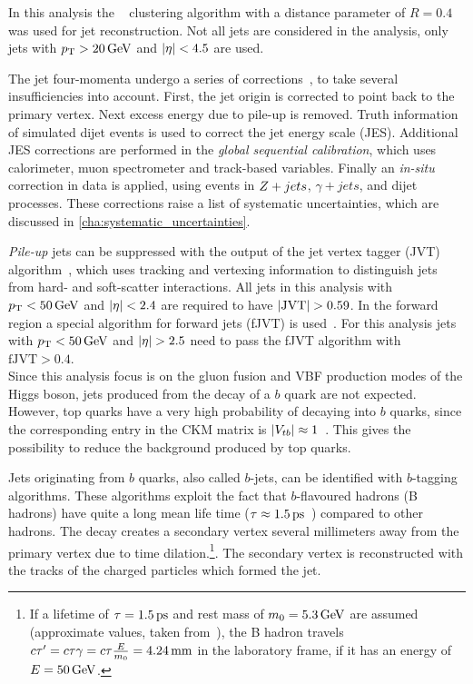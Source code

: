 In this analysis the \antikt{}~\cite{Cacciari:2008gp,Cacciari:2005hq} clustering algorithm with a distance parameter
of $R = 0.4$ was used for jet reconstruction.
Not all jets are considered in the analysis, only jets with $\pt > \unit[20]{GeV}$ and $\left|\eta\right| < 4.5$ are used.

The jet four-momenta undergo a series of corrections~\cite{PERF-2016-04}, to take several insufficiencies into account.
First, the jet origin is corrected to point back to the primary vertex. Next excess energy due to pile-up is removed.
Truth information of simulated dijet events is used to correct the jet energy scale (JES).
Additional JES corrections are performed in the \emph{global sequential calibration}, which uses calorimeter, muon
spectrometer and track-based variables. Finally an \emph{in-situ} correction in data is applied, using events
in $Z+jets$, $\gamma + jets$, and dijet processes.
These corrections raise a list of systematic uncertainties, which are discussed in \cref{cha:systematic_uncertainties}.

\emph{Pile-up} jets can be suppressed with the output of the jet vertex tagger (JVT) algorithm~\cite{PERF-2014-03}, which
uses tracking and vertexing information to distinguish jets from hard- and soft-scatter interactions.
All jets in this analysis with $\pt < \unit[50]{GeV}$ and $\left|\eta\right| < 2.4$ are required to have $\left|\text{JVT}\right| > 0.59$.
In the forward region a special algorithm for forward jets (fJVT) is used~\cite{ATL-PHYS-PUB-2015-034}.
For this analysis jets with $\pt < \unit[50]{GeV}$ and $\left|\eta\right| > 2.5$ need to pass the fJVT algorithm with
$\text{fJVT} > 0.4$.
\\[\baselineskip]
Since this analysis focus is on the gluon fusion and VBF production modes of the Higgs boson, jets produced from
the decay of a $b$ quark are not expected. However, top quarks have a very high probability of decaying into $b$ quarks,
since the corresponding entry in the CKM matrix is $\left|V_{tb}\right| \approx 1$~\cite{PDG}.
This gives the possibility to reduce the background produced by top quarks.

Jets originating from $b$ quarks, also called $b$-jets, can be identified with $b$-tagging algorithms.
These algorithms exploit the fact that $b$-flavoured hadrons (B hadrons) have quite a long mean life time
($\tau \approx \unit[1.5]{ps}$~\cite{PDG}) compared to other hadrons.
The decay creates a secondary vertex several millimeters away from the primary vertex due to time
dilation.\footnote{If a lifetime of $\tau = \unit[1.5]{ps}$ and rest mass of $m_0 = \unit[5.3]{GeV}$ are assumed (approximate values, taken from~\cite{PDG}),
the B hadron travels $c\tau' = c \tau \gamma = c \tau \frac{E}{m_0} = \unit[4.24]{mm}$ in the laboratory frame, if it has an energy of $E = \unit[50]{GeV}$.}.
The secondary vertex is reconstructed with the tracks of the charged particles which formed the jet.

